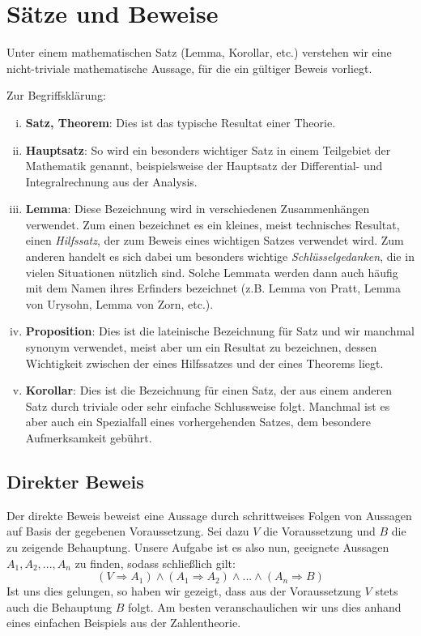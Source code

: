 \section{Sätze und Beweise}

Unter einem mathematischen Satz (Lemma, Korollar, etc.) verstehen wir eine
nicht-triviale mathematische Aussage, für die ein gültiger Beweis vorliegt.

\begin{remark}
Zur Begriffsklärung:

\begin{enumerate}[(i)]
\item \textbf{Satz, Theorem}: Dies ist das typische Resultat einer Theorie.

\item \textbf{Hauptsatz}:
So wird ein besonders wichtiger Satz in einem Teilgebiet der Mathematik
genannt, beispielsweise der Hauptsatz der Differential- und Integralrechnung
aus der Analysis.

\item \textbf{Lemma}:
Diese Bezeichnung wird in verschiedenen Zusammenhängen verwendet.
Zum einen bezeichnet es ein kleines, meist technisches Resultat, einen
\textit{Hilfssatz}, der zum Beweis eines wichtigen Satzes verwendet wird.
Zum anderen handelt es sich dabei um besonders wichtige
\textit{Schlüsselgedanken}, die in vielen Situationen nützlich sind.
Solche Lemmata werden dann auch häufig mit dem Namen ihres Erfinders bezeichnet
(z.B. Lemma von Pratt, Lemma von Urysohn, Lemma von Zorn, etc.).

\item \textbf{Proposition}:
Dies ist die lateinische Bezeichnung für Satz und wir manchmal synonym
verwendet, meist aber um ein Resultat zu bezeichnen, dessen Wichtigkeit
zwischen der eines Hilfssatzes und der eines Theorems liegt.

\item \textbf{Korollar}:
Dies ist die Bezeichnung für einen Satz, der aus einem anderen Satz durch
triviale oder sehr einfache Schlussweise folgt.
Manchmal ist es aber auch ein Spezialfall eines vorhergehenden Satzes, dem
besondere Aufmerksamkeit gebührt.
\end{enumerate}
\end{remark}


\subsection{Direkter Beweis}
Der direkte Beweis beweist eine Aussage durch schrittweises Folgen von Aussagen
auf Basis der gegebenen Voraussetzung.
Sei dazu $V$ die Voraussetzung und $B$ die zu zeigende Behauptung.
Unsere Aufgabe ist es also nun, geeignete Aussagen $A_1, A_2,...,A_n$ zu
finden, sodass schließlich gilt:
\[
  (V \Rightarrow A_1) \wedge (A_1 \Rightarrow A_2) \wedge ... \wedge
  (A_n \Rightarrow B)
\]
Ist uns dies gelungen, so haben wir gezeigt, dass aus der Voraussetzung $V$
stets auch die Behauptung $B$ folgt.
Am besten veranschaulichen wir uns dies anhand eines einfachen Beispiels aus
der Zahlentheorie.


